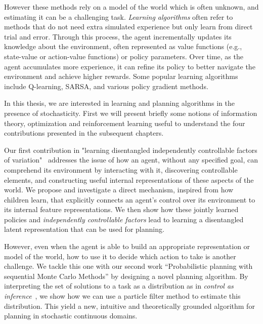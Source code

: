 However these methods rely on a model of the world which is often unknown, and estimating it can be a challenging task. \emph{Learning algorithms} often refer to methods that do not need extra simulated experience but only learn from direct trial and error. Through this process, the agent incrementally updates its knowledge about the environment, often represented as value functions (e.g., state-value or action-value functions) or policy parameters. Over time, as the agent accumulates more experience, it can refine its policy to better navigate the environment and achieve higher rewards. Some popular learning algorithms include Q-learning, SARSA, and various policy gradient methods.

In this thesis, we are interested in learning and planning algorithms in the presence of stochasticity. First we will present briefly some notions of information theory, optimization and reinforcement learning useful to understand the four contributions presented in the subsequent chapters.%

Our first contribution in "learning disentangled independently controllable factors of variation"~\citep{bengio2017independently, thomas2017independently, thomas2018disentangling} addresses the issue of how an agent, without any specified goal, can comprehend its environment by interacting with it, discovering controllable elements, and constructing useful internal representations of these aspects of the world. We propose and investigate a direct mechanism, inspired from how children learn, that explicitly connects an agent's control over its environment to its internal feature representations. We then show how these jointly learned policies and \emph{independently controllable factors} lead to learning a disentangled latent representation that can be used for planning. 

However, even when the agent is able to build an appropriate representation or model of the world, how to use it to decide which action to take is another challenge.
We tackle this one with our second work ``Probabilistic planning with sequential Monte Carlo Methods'' by designing a novel planning algorithm. By interpreting the set of solutions to a task as a distribution as in \textit{control as inference}~\citep{toussaint2006probabilistic, toussaint2009robot, levine2018reinforcement}, we show how we can use a particle filter method to estimate this distribution. This yield a new, intuitive and theoretically grounded algorithm for planning in stochastic continuous domains.

